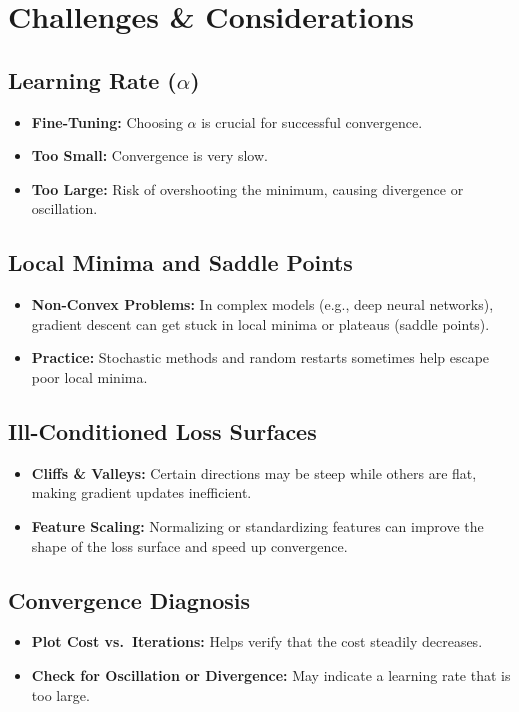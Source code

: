\documentclass{article}
\begin{document}
\section{Challenges \& Considerations}

\subsection{Learning Rate (\(\alpha\))}
\begin{itemize}
    \item \textbf{Fine-Tuning:} Choosing \(\alpha\) is crucial for successful convergence.
    \item \textbf{Too Small:} Convergence is very slow.
    \item \textbf{Too Large:} Risk of overshooting the minimum, causing divergence or oscillation.
\end{itemize}

\subsection{Local Minima and Saddle Points}
\begin{itemize}
    \item \textbf{Non-Convex Problems:} In complex models (e.g., deep neural networks), gradient descent can get stuck in local minima or plateaus (saddle points).
    \item \textbf{Practice:} Stochastic methods and random restarts sometimes help escape poor local minima.
\end{itemize}

\subsection{Ill-Conditioned Loss Surfaces}
\begin{itemize}
    \item \textbf{Cliffs \& Valleys:} Certain directions may be steep while others are flat, making gradient updates inefficient.
    \item \textbf{Feature Scaling:} Normalizing or standardizing features can improve the shape of the loss surface and speed up convergence.
\end{itemize}

\subsection{Convergence Diagnosis}
\begin{itemize}
    \item \textbf{Plot Cost vs.\ Iterations:} Helps verify that the cost steadily decreases.
    \item \textbf{Check for Oscillation or Divergence:} May indicate a learning rate that is too large.
\end{itemize}
\end{document}
